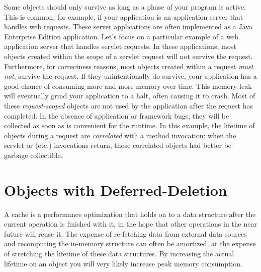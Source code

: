 Some objects should only survive as long as a phase of your program is active.
This is common, for example, if your application is an application server that
handles web requests. These server applications are often implemented as a Java
Enterprise Edition application. Let's focus on a particular example of a web
application server that handles servlet requests. In these applications, most
objects created within the scope of a servlet request will not survive the
request. Furthermore, for correctness reasons, most objects created within a
request {\em must not}, survive the request. If they unintentionally do survive,
your application has a good chance of consuming more and more memory over time.
 This memory leak will eventually grind your application to a
halt, often causing it to crash. Most of these {\em request-scoped}
 objects are not used by the application after the
request has completed. In the absence of application or framework bugs, they will
be collected as soon as is convenient for the runtime. In this example, the
lifetime of objects during a request are {\em correlated} with a method
invocation: when the servlet  or  (etc.) invocations
return, those correlated objects had better be garbage collectible.


\section{Objects with Deferred-Deletion}
\label{deferred-deletion}

A cache is a performance optimization that holds on to a data structure after the
current operation is finished with it, in the hope that other operations in the
near future will reuse it. The expense of re-fetching data from external data
sources and recomputing the in-memory structure can often be amortized, at the
expense of stretching the lifetime of these data structures. By increasing the
actual lifetime on an object you will very likely increase peak memory
consumption.








